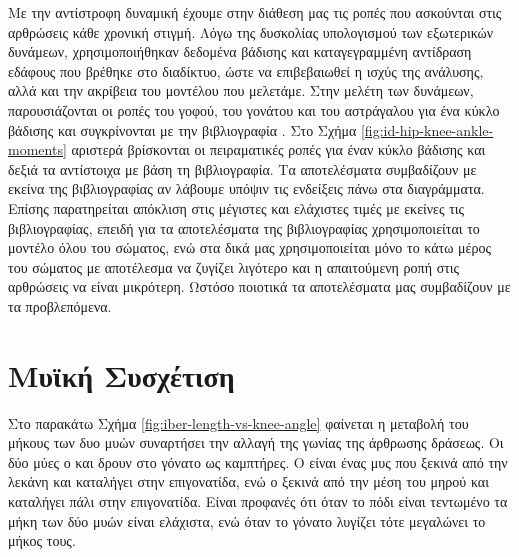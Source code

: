 Με την αντίστροφη δυναμική έχουμε στην διάθεση μας τις ροπές που ασκούνται στις αρθρώσεις κάθε χρονική στιγμή. Λόγω της δυσκολίας υπολογισμού των εξωτερικών δυνάμεων, χρησιμοποιήθηκαν δεδομένα βάδισης και καταγεγραμμένη αντίδραση εδάφους που βρέθηκε στο διαδίκτυο, ώστε να επιβεβαιωθεί η ισχύς της ανάλυσης, αλλά και την ακρίβεια του μοντέλου που μελετάμε. Στην μελέτη των δυνάμεων, παρουσιάζονται οι ροπές του γοφού, του γονάτου και του αστράγαλου για ένα κύκλο βάδισης και συγκρίνονται με την βιβλιογραφία \cite{whittlesey}. Στο Σχήμα \ref{fig:id-hip-knee-ankle-moments} αριστερά βρίσκονται οι πειραματικές ροπές για έναν κύκλο βάδισης και δεξιά τα αντίστοιχα με βάση τη βιβλιογραφία. Τα αποτελέσματα συμβαδίζουν με εκείνα της βιβλιογραφίας αν λάβουμε υπόψιν τις ενδείξεις πάνω στα διαγράμματα. Επίσης παρατηρείται απόκλιση στις μέγιστες και ελάχιστες τιμές με εκείνες τις βιβλιογραφίας, επειδή για τα αποτελέσματα της βιβλιογραφίας χρησιμοποιείται το μοντέλο όλου του σώματος, ενώ στα δικά μας χρησιμοποιείται μόνο το κάτω μέρος του σώματος με αποτέλεσμα να ζυγίζει λιγότερο και η απαιτούμενη ροπή στις αρθρώσεις να είναι μικρότερη. Ωστόσο ποιοτικά τα αποτελέσματα μας συμβαδίζουν με τα προβλεπόμενα.


\section{Μυϊκή Συσχέτιση}

Στο παρακάτω Σχήμα \ref{fig:iber-length-vs-knee-angle} φαίνεται η μεταβολή του μήκους των δυο μυών συναρτήσει την αλλαγή της γωνίας της άρθρωσης δράσεως. Οι δύο μύες ο  και  δρουν στο γόνατο ως καμπτήρες. Ο  είναι ένας μυς που ξεκινά από την λεκάνη και καταλήγει στην επιγονατίδα, ενώ  ο  ξεκινά από την μέση του μηρού και καταλήγει πάλι στην επιγονατίδα. Είναι προφανές ότι όταν το πόδι είναι τεντωμένο τα μήκη των δύο μυών είναι ελάχιστα, ενώ όταν το γόνατο λυγίζει τότε μεγαλώνει το μήκος τους.

